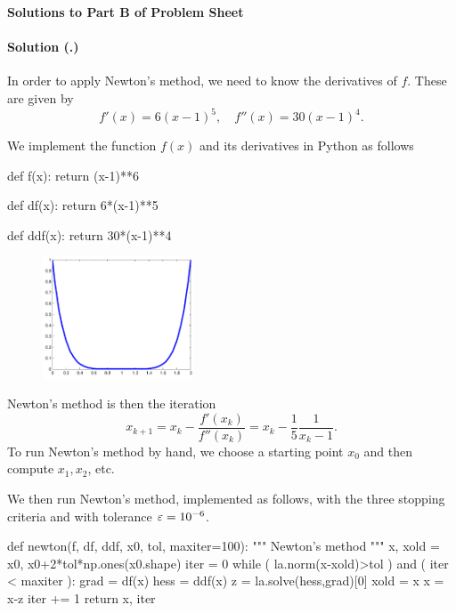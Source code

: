 \documentclass{article}
\newcounter{problemSheetNumber}
\newcounter{problems}
\renewcommand{\solution}[1]{\paragraph{Solution (\theproblemSheetNumber.\theproblems)}\addtocounter{problems}{1}\label{#1}}
\begin{document}
 
\begin{center}
{\Large {\bf Solutions to Part B of Problem Sheet \theproblemSheetNumber}}
\end{center}

\solution{pr:1} In order to apply Newton's method, we need to know the derivatives of $f$. These are given by
\begin{equation*}
  f'(x) = 6(x-1)^5, \quad f''(x) = 30(x-1)^4.
\end{equation*}

We implement the function $f(x)$ and its derivatives in Python as follows

\begin{ipythonnb}
def f(x):
    return (x-1)**6
    
def df(x):
    return 6*(x-1)**5
    
def ddf(x):
    return 30*(x-1)**4
\end{ipythonnb}

\begin{figure}[h!]
 \centering
 \includegraphics[width=0.4\textwidth]{images/flat_cropped.pdf}
\end{figure}

Newton's method is then the iteration
\begin{equation*}
  x_{k+1} = x_k - \frac{f'(x_k)}{f''(x_k)} = x_k - \frac{1}{5}\frac{1}{x_k-1}.
\end{equation*}
To run Newton's method by hand, we choose a starting point $x_0$ and then compute $x_1, x_2$, etc. 

We then run Newton's method, implemented as follows, with the three stopping criteria and with tolerance $\varepsilon=10^{-6}$. 

\begin{ipythonnb}
def newton(f, df, ddf, x0, tol, maxiter=100):
    """
    Newton's method
    """
    x, xold = x0, x0+2*tol*np.ones(x0.shape)
    iter = 0
    while ( la.norm(x-xold)>tol ) and ( iter < maxiter ):
        grad = df(x)
        hess = ddf(x)
        z = la.solve(hess,grad)[0]
        xold = x
        x = x-z
        iter += 1
    return x, iter	
\end{ipythonnb}
\end{document}
